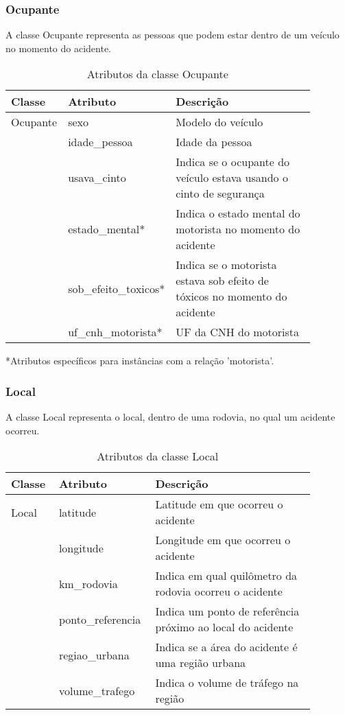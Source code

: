 
\subsubsection{\textbf{Ocupante}}

  A classe Ocupante representa as pessoas que podem estar dentro de um veículo no momento do acidente.
  
    \begin{table*}[!h]
    \centering
    \begin{tabular}{p{0.15\linewidth}p{0.23\linewidth}p{0.5\linewidth}}
      \hline
      \textbf{Classe} & \textbf{Atributo} & \textbf{Descrição}\\
      \hline
	Ocupante & sexo & Modelo do veículo\\
		 & idade\_pessoa & Idade da pessoa\\
		 & usava\_cinto & Indica se o ocupante do veículo estava usando o cinto de segurança\\
		 & estado\_mental* & Indica o estado mental do motorista no momento do acidente\\
		 & sob\_efeito\_toxicos* & Indica se o motorista estava sob efeito de tóxicos no momento do acidente\\
		 & uf\_cnh\_motorista* & UF da CNH do motorista\\
      \hline
    \end{tabular}
    *Atributos específicos para instâncias com a relação 'motorista'.

    \caption{Atributos da classe Ocupante}
    \label{tab:attr_ocupante}
    \end{table*}
    
\subsubsection{\textbf{Local}}

  A classe Local representa o local, dentro de uma rodovia, no qual um acidente ocorreu.
  
    \begin{table*}[!h]
    \centering
    \begin{tabular}{p{0.15\linewidth}p{0.23\linewidth}p{0.5\linewidth}}
      \hline
      \textbf{Classe} & \textbf{Atributo} & \textbf{Descrição}\\
      \hline
	Local & latitude & Latitude em que ocorreu o acidente\\
	      & longitude & Longitude em que ocorreu o acidente\\
	      & km\_rodovia & Indica em qual quilômetro da rodovia ocorreu o acidente\\
	      & ponto\_referencia & Indica um ponto de referência próximo ao local do acidente\\
	      & regiao\_urbana & Indica se a área do acidente é uma região urbana\\
	      & volume\_trafego & Indica o volume de tráfego na região\\
      \hline
    \end{tabular}
    \caption{Atributos da classe Local}
    \label{tab:attr_local}
    \end{table*}

